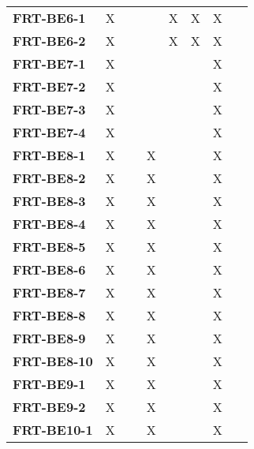 \documentclass[12pt, titlepage]{article}
\begin{document}
\begin{table}[H]
\begin{adjustbox}{max width=0.6\paperwidth}
\begin{tabular}{l|ccccccc}
        \textbf{FRT-BE6-1}  & X & ~ & ~ & X & X & X & ~\\
        \textbf{FRT-BE6-2}  & X & ~ & ~ & X & X & X & ~\\
        \textbf{FRT-BE7-1}  & X & ~ & ~ & ~ & ~ & X & ~\\
        \textbf{FRT-BE7-2}  & X & ~ & ~ & ~ & ~ & X & ~\\
        \textbf{FRT-BE7-3}  & X & ~ & ~ & ~ & ~ & X & ~\\
        \textbf{FRT-BE7-4}  & X & ~ & ~ & ~ & ~ & X & ~\\
        \textbf{FRT-BE8-1}  & X & ~ & X & ~ & ~ & X & ~\\
        \textbf{FRT-BE8-2}  & X & ~ & X & ~ & ~ & X & ~\\
        \textbf{FRT-BE8-3}  & X & ~ & X & ~ & ~ & X & ~\\
        \textbf{FRT-BE8-4}  & X & ~ & X & ~ & ~ & X & ~\\
        \textbf{FRT-BE8-5}  & X & ~ & X & ~ & ~ & X & ~\\
        \textbf{FRT-BE8-6}  & X & ~ & X & ~ & ~ & X & ~\\
        \textbf{FRT-BE8-7}  & X & ~ & X & ~ & ~ & X & ~\\
        \textbf{FRT-BE8-8}  & X & ~ & X & ~ & ~ & X & ~\\
        \textbf{FRT-BE8-9}  & X & ~ & X & ~ & ~ & X & ~\\
        \textbf{FRT-BE8-10} & X & ~ & X & ~ & ~ & X & ~\\
        \textbf{FRT-BE9-1}  & X & ~ & X & ~ & ~ & X & ~\\
        \textbf{FRT-BE9-2}  & X & ~ & X & ~ & ~ & X & ~\\
        \textbf{FRT-BE10-1} & X & ~ & X & ~ & ~ & X & ~\\
    \end{tabular}
    \end{adjustbox}
\end{table}
\end{document}
